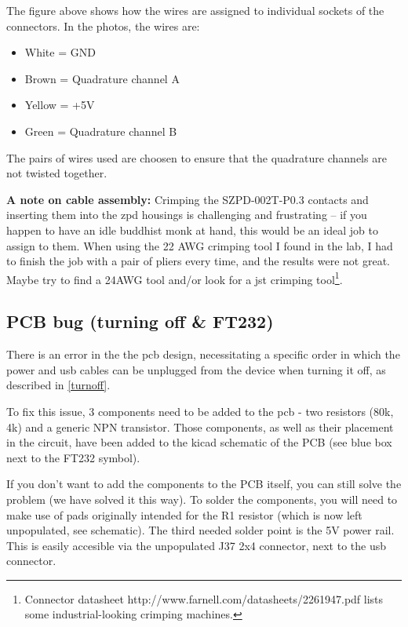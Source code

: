 \documentclass[twoside]{article}
\begin{document}
The figure above shows how the wires are assigned to individual sockets of the connectors. In the photos, the wires are: 

\begin{itemize}
\item White = GND
\item Brown = Quadrature channel A
\item Yellow = +5V
\item Green = Quadrature channel B
\end{itemize}

The pairs of wires used are choosen to ensure that the quadrature channels are not twisted together.

\noindent\textbf{A note on cable assembly:} Crimping the SZPD-002T-P0.3 contacts and inserting them into the zpd housings is challenging and frustrating -- if you happen to have an idle buddhist monk at hand, this would be an ideal job to assign to them. When using the 22 AWG crimping tool I found in the lab, I had to finish the job with a pair of pliers every time, and the results were not great. Maybe try to find a 24AWG tool and/or look for a jst crimping tool\footnote{Connector datasheet http://www.farnell.com/datasheets/2261947.pdf lists some industrial-looking crimping machines.}.


\subsection{PCB bug (turning off & FT232)}
\label{hwbug}

There is an error in the the pcb design, necessitating a specific order in which the power and usb cables can be unplugged from the device when turning it off, as described in \ref{turnoff}. 

To fix this issue, 3 components need to be added to the pcb - two resistors (80k, 4k) and a generic NPN transistor. Those components, as well as their placement in the circuit, have been added to the kicad schematic of the PCB (see blue box next to the FT232 symbol).

If you don't want to add the components to the PCB itself, you can still solve the problem (we have solved it this way). To solder the components, you will need to make use of pads originally intended for the R1 resistor (which is now left unpopulated, see schematic). The third needed solder point is the 5V power rail. This is easily accesible via the unpopulated J37 2x4 connector, next to the usb connector.
\end{document}
